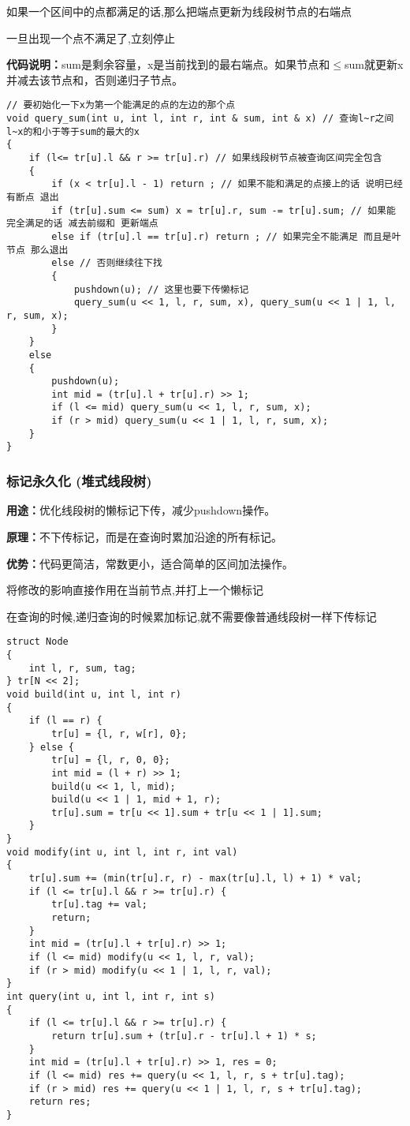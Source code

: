 \documentclass[a4paper, fontset=none]{ctexart}
\begin{document}
如果一个区间中的点都满足的话,那么把端点更新为线段树节点的右端点

一旦出现一个点不满足了,立刻停止

\textbf{代码说明：}sum是剩余容量，x是当前找到的最右端点。如果节点和$\leq$sum就更新x并减去该节点和，否则递归子节点。
\begin{verbatim}
// 要初始化一下x为第一个能满足的点的左边的那个点
void query_sum(int u, int l, int r, int & sum, int & x) // 查询l~r之间 l~x的和小于等于sum的最大的x
{
    if (l<= tr[u].l && r >= tr[u].r) // 如果线段树节点被查询区间完全包含
    {
        if (x < tr[u].l - 1) return ; // 如果不能和满足的点接上的话 说明已经有断点 退出
        if (tr[u].sum <= sum) x = tr[u].r, sum -= tr[u].sum; // 如果能完全满足的话 减去前缀和 更新端点
        else if (tr[u].l == tr[u].r) return ; // 如果完全不能满足 而且是叶节点 那么退出
        else // 否则继续往下找
        {
            pushdown(u); // 这里也要下传懒标记
            query_sum(u << 1, l, r, sum, x), query_sum(u << 1 | 1, l, r, sum, x);
        }
    }
    else
    {
        pushdown(u);
        int mid = (tr[u].l + tr[u].r) >> 1;
        if (l <= mid) query_sum(u << 1, l, r, sum, x);
        if (r > mid) query_sum(u << 1 | 1, l, r, sum, x);
    }
}
\end{verbatim}
\subsubsection{标记永久化 (堆式线段树)}
\textbf{用途：}优化线段树的懒标记下传，减少pushdown操作。

\textbf{原理：}不下传标记，而是在查询时累加沿途的所有标记。

\textbf{优势：}代码更简洁，常数更小，适合简单的区间加法操作。

将修改的影响直接作用在当前节点,并打上一个懒标记

在查询的时候,递归查询的时候累加标记,就不需要像普通线段树一样下传标记
\begin{verbatim}
struct Node
{
    int l, r, sum, tag;
} tr[N << 2];
void build(int u, int l, int r)
{
    if (l == r) {
        tr[u] = {l, r, w[r], 0};
    } else {
        tr[u] = {l, r, 0, 0};
        int mid = (l + r) >> 1;
        build(u << 1, l, mid);
        build(u << 1 | 1, mid + 1, r);
        tr[u].sum = tr[u << 1].sum + tr[u << 1 | 1].sum;
    }
}
void modify(int u, int l, int r, int val)
{
    tr[u].sum += (min(tr[u].r, r) - max(tr[u].l, l) + 1) * val;
    if (l <= tr[u].l && r >= tr[u].r) {
        tr[u].tag += val;
        return;
    }
    int mid = (tr[u].l + tr[u].r) >> 1;
    if (l <= mid) modify(u << 1, l, r, val);
    if (r > mid) modify(u << 1 | 1, l, r, val);
}
int query(int u, int l, int r, int s)
{
    if (l <= tr[u].l && r >= tr[u].r) {
        return tr[u].sum + (tr[u].r - tr[u].l + 1) * s;
    }
    int mid = (tr[u].l + tr[u].r) >> 1, res = 0;
    if (l <= mid) res += query(u << 1, l, r, s + tr[u].tag);
    if (r > mid) res += query(u << 1 | 1, l, r, s + tr[u].tag);
    return res;
}
\end{verbatim}
\end{document}
